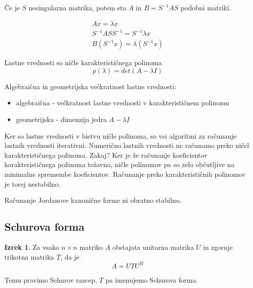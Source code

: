 \documentclass[a4paper,12pt]{article}
\theoremstyle{definition}
\newtheorem{theorem}[counter]{Izrek}
\theoremstyle{remark}
\begin{document}
Če je $S$ nesingularna matrika, potem sta $A$ in $B = S^{-1}AS$ podobni matriki.

\begin{gather*}
    Ax = \lambda x \\
    S^{-1} AS S^{-1} = S^{-1} \lambda x \\
    B(S^{-1} x) = \lambda (S^{-1} x)
\end{gather*}


Lastne vrednosti so ničle karakterističnega polinoma
\begin{equation*}
    p(\lambda) = det(A - \lambda I)
\end{equation*}

Algebraična in geometrijska večkratnost lastne vrednosti:
\begin{itemize}
    \item algebraična - večkratnost lastne vrednosti v karakterističnem polinomu
    \item geometrijska - dimenzija jedra $A - \lambda I$
\end{itemize}

Ker so lastne vrednosti v bistvu ničle polinoma, so vsi algoritmi za računanje lastnih vrednosti iterativni. Numerično lastnih vrednosti ne računamo
preko ničel karakterističnega polinoma. Zakaj? Ker je že računanje koeficientov karakterističnega polinoma težavno, ničle polinomov pa so zelo občutljive
na minimalne spremembe koeficientov. Računanje preko karakterističnih polinomov je torej nestabilno.

Računanje Jordanove kanonične forme ni obratno stabilno.

\subsection{Schurova forma}

\begin{theorem}
    Za vsako $n \times n$ matriko $A$ obstajata unitarna matrika $U$ in zgornje trikotna matrika $T$, da je
    \begin{equation*}
        A = U T U^H
    \end{equation*}

    Temu pravimo Schurov razcep, $T$ pa imenujemo Schurova forma.
\end{theorem}
\end{document}
